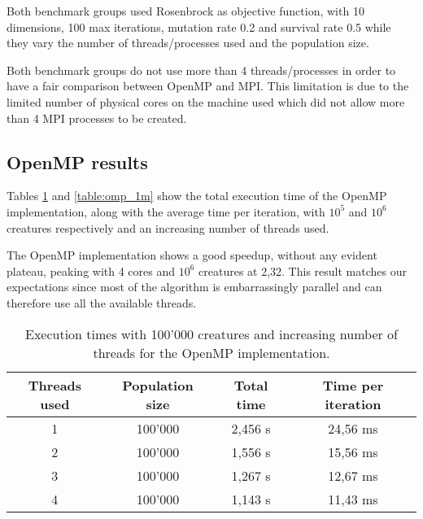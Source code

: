 \documentclass[12pt,a4paper,oneside]{article}
\begin{document}
	Both benchmark groups used Rosenbrock as objective function, with 10 dimensions, 100 max iterations, mutation rate 0.2 and survival rate 0.5 while they vary the number of threads/processes used and the population size.

	Both benchmark groups do not use more than 4 threads/processes in order to have a fair comparison between OpenMP and MPI.
	This limitation is due to the limited number of physical cores on the machine used which did not allow more than 4 MPI processes to be created.

	\subsection{OpenMP results}
	Tables \ref{table:omp_100k} and \ref{table:omp_1m} show the total execution time of the OpenMP implementation, along with the average time per iteration, with $10^5$ and $10^6$ creatures respectively and an increasing number of threads used.

	The OpenMP implementation shows a good speedup, without any evident plateau, peaking with 4 cores and $10^6$ creatures at 2,32.
	This result matches our expectations since most of the algorithm is embarrassingly parallel and can therefore use all the available threads.

	\begin{table}[!ht]
		\centering
		\begin{tabular}{|c|c|c|c|}
		\hline
		Threads used & Population size & Total time & Time per iteration \\ \hline
		1                 & 100'000             & 2,456 s            & 24,56 ms                    \\ \hline
		2                 & 100'000             & 1,556 s            & 15,56 ms                    \\ \hline
		3                 & 100'000             & 1,267 s            & 12,67 ms                    \\ \hline
		4                 & 100'000             & 1,143 s            & 11,43 ms                    \\ \hline
		\end{tabular}
		\caption{Execution times with 100'000 creatures and increasing number of threads for the OpenMP implementation.}
		\label{table:omp_100k}
	\end{table}
\end{document}
